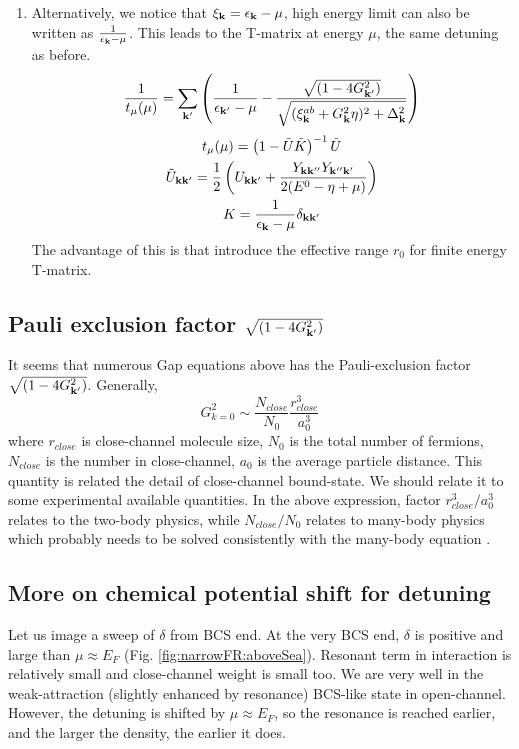 \begin{enumerate}
\item  Alternatively, we notice that $\xi_{\mathbf{k}}=\epsilon_{\mathbf{k}}-\mu$, high energy limit can also be written as 
$\frac{1}{\epsilon_{\mathbf{k}}-\mu}$.  This leads to the T-matrix at energy $\mu$, the same detuning as before.  
\begin{equation}\label{eq:20101004:renormGap2}
\frac{1}{{t_{\mu}}(\mu)}=\sum_{\mathbf{k}'}
\left(\frac{1}{\epsilon_{\mathbf{k}'}-\mu}-\frac{\sqrt{(1-4G_{\mathbf{k}'}^{2})}}{\sqrt{{(\xi^{ab}_{\mathbf{k}}+  G_{\mathbf{k}}^2\eta)^{2}+\Delta_{\mathbf{k}}^{2}}}}\right)
\end{equation} 
\begin{gather}
{t_{\mu}}(\mu)=\left(1-\tilde{U}\tilde{ K}\right)^{-1}\tilde{U}\label{eq:20101004:t02}\\
\tilde{U}_{\mathbf{k}\mathbf{k}'}=\frac{1}{2} \left(U_{\mathbf{k}\mathbf{k}'}+\frac{Y_{\mathbf{k}\mathbf{k}''}Y_{\mathbf{k}''\mathbf{k}'}}{2(E^{0}-\eta+\mu)}\right)\label{eq:20101004:tu2}\\
{K}=\frac{1}{\epsilon_{\mathbf{k}}-\mu}\delta_{\mathbf{k}\mathbf{k}'}\label{eq:20101004:tk2}
\end{gather}
The advantage of this is that introduce the effective range $r_{0}$ for finite energy T-matrix. 
\end{enumerate}

\subsection{Pauli exclusion factor  $\sqrt{(1-4G_{\mathbf{k}'}^{2})}$ }
It seems that numerous Gap equations above has the Pauli-exclusion factor $\sqrt{(1-4G_{\mathbf{k}'}^{2})}$.  Generally, 
\begin{equation}
G_{k=0}^{2}\sim{\frac{N_{close}}{N_{0}}\frac{r_{close}^{3}}{a_{0}^{3}}}
\end{equation}
where $r_{close}$ is close-channel molecule size, $N_{0}$ is the total number of fermions, $N_{close}$ is the number in close-channel, $a_{0}$ is the average particle distance.  This quantity is related the detail of close-channel bound-state.  We should relate it to some experimental available quantities.  In the above expression, factor $r_{close}^{3}/a_{0}^{3}$ relates to the two-body physics, while $N_{close}/N_{0}$ relates to many-body physics which probably needs to be solved consistently with the many-body equation .  

\subsection{More on chemical potential shift for detuning}
Let us image a sweep of $\delta$ from BCS end.  At the very BCS end, $\delta$ is positive and large than $\mu\approx{}E_{F}$ (Fig. \ref{fig:narrowFR:aboveSea}). Resonant term in interaction is relatively small and close-channel weight is small too.  We are very well in the  weak-attraction (slightly enhanced by resonance) BCS-like state in open-channel.  However, the detuning is shifted by $\mu\approx{}E_{F}$, so the resonance is reached earlier, and the larger the density, the earlier it does.  

